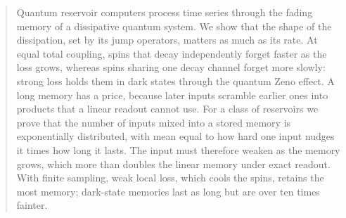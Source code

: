 \begin{abstract}
Quantum reservoir computers process time series through the fading memory of a dissipative quantum system. We show
that the shape of the dissipation, set by its jump operators, matters as much as its rate. At equal total coupling,
spins that decay independently forget faster as the loss grows, whereas spins sharing one decay channel forget more
slowly: strong loss holds them in dark states through the quantum Zeno effect. A long memory has a price, because
later inputs scramble earlier ones into products that a linear readout cannot use. For a class of reservoirs we prove
that the number of inputs mixed into a stored memory is exponentially distributed, with mean equal to how hard one
input nudges it times how long it lasts. The input must therefore weaken as the memory grows, which more than doubles
the linear memory under exact readout. With finite sampling, weak local loss, which cools the spins, retains the most
memory; dark-state memories last as long but are over ten times fainter.
\end{abstract}
